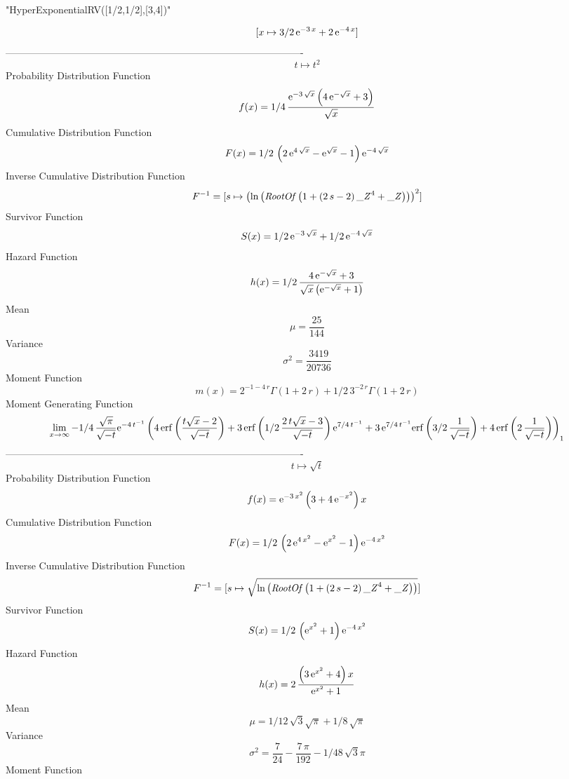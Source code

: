 \documentclass[12pt]{article}
\begin{document}
 
                    "HyperExponentialRV([1/2,1/2],[3,4])"

$$[x\mapsto 3/2\,{{\rm e}^{-3\,x}}+2\,{{\rm e}^{-4\,x}}]
$$-------------------------------------------------------------------------------------------  \\$$t\mapsto {t}^{2}
$$Probability Distribution Function 
$$  f(x)=1/4\,{\frac {{{\rm e}^{-3\,\sqrt {x}}} \left( 4\,{{\rm e}^{-\sqrt {x}}
}+3 \right) }{\sqrt {x}}}
$$Cumulative Distribution Function  
 $$F(x)=1/2\, \left( 2\,{{\rm e}^{4\,\sqrt {x}}}-{{\rm e}^{\sqrt {x}}}-1
 \right) {{\rm e}^{-4\,\sqrt {x}}}
$$ Inverse Cumulative Distribution Function 
  $$F^{-1} = [s\mapsto  \left( \ln  \left( {\it RootOf} \left( 1+ \left( 2\,s-2
 \right) {{\it \_Z}}^{4}+{\it \_Z} \right)  \right)  \right) ^{2}]
$$Survivor Function 
 $$ S(x)=1/2\,{{\rm e}^{-3\,\sqrt {x}}}+1/2\,{{\rm e}^{-4\,\sqrt {x}}}
$$ Hazard Function 
 $$ h(x)=1/2\,{\frac {4\,{{\rm e}^{-\sqrt {x}}}+3}{\sqrt {x} \left( {{\rm e}^{-
\sqrt {x}}}+1 \right) }}
$$Mean 
 $$ \mu={\frac{25}{144}}
$$ Variance 
 $$ \sigma^2 = {\frac{3419}{20736}}
$$Moment Function 
 $$ m(x) = {2}^{-1-4\,r}\Gamma \left( 1+2\,r \right) +1/2\,{3}^{-2\,r}\Gamma
 \left( 1+2\,r \right) 
$$ Moment Generating Function 
 $$\lim _{x\rightarrow \infty }-1/4\,{\frac {\sqrt {\pi}}{\sqrt {-t}}{
{\rm e}^{-4\,{t}^{-1}}} \left( 4\,{\rm erf} \left({\frac {t\sqrt {x}-2
}{\sqrt {-t}}}\right)+3\,{\rm erf} \left(1/2\,{\frac {2\,t\sqrt {x}-3
}{\sqrt {-t}}}\right){{\rm e}^{7/4\,{t}^{-1}}}+3\,{{\rm e}^{7/4\,{t}^{
-1}}}{\rm erf} \left(3/2\,{\frac {1}{\sqrt {-t}}}\right)+4\,{\rm erf} 
\left(2\,{\frac {1}{\sqrt {-t}}}\right) \right) }_{{1}}
$$-------------------------------------------------------------------------------------------  \\$$t\mapsto \sqrt {t}
$$Probability Distribution Function 
$$  f(x)={{\rm e}^{-3\,{x}^{2}}} \left( 3+4\,{{\rm e}^{-{x}^{2}}} \right) x
$$Cumulative Distribution Function  
 $$F(x)=1/2\, \left( 2\,{{\rm e}^{4\,{x}^{2}}}-{{\rm e}^{{x}^{2}}}-1 \right) {
{\rm e}^{-4\,{x}^{2}}}
$$ Inverse Cumulative Distribution Function 
  $$F^{-1} = [s\mapsto \sqrt {\ln  \left( {\it RootOf} \left( 1+ \left( 2\,s-2
 \right) {{\it \_Z}}^{4}+{\it \_Z} \right)  \right) }]
$$Survivor Function 
 $$ S(x)=1/2\, \left( {{\rm e}^{{x}^{2}}}+1 \right) {{\rm e}^{-4\,{x}^{2}}}
$$ Hazard Function 
 $$ h(x)=2\,{\frac { \left( 3\,{{\rm e}^{{x}^{2}}}+4 \right) x}{{{\rm e}^{{x}^{
2}}}+1}}
$$Mean 
 $$ \mu=1/12\,\sqrt {3}\sqrt {\pi}+1/8\,\sqrt {\pi}
$$ Variance 
 $$ \sigma^2 = {\frac{7}{24}}-{\frac {7\,\pi}{192}}-1/48\,\sqrt {3}\pi
$$Moment Function 
\end{document}
